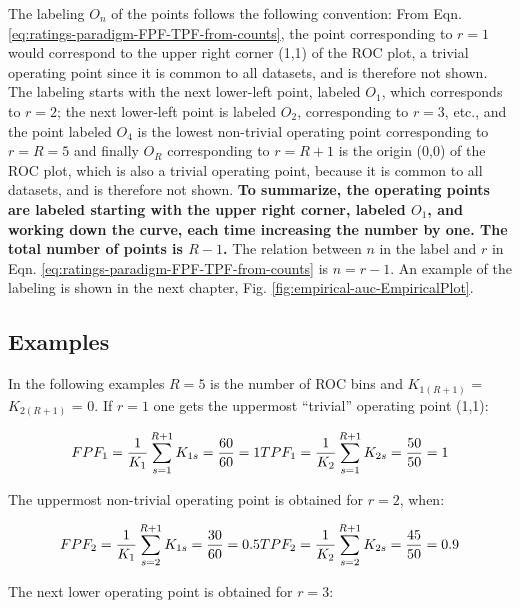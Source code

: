 \documentclass[
]{book}
\begin{document}
The labeling \(O_n\) of the points follows the following convention: From Eqn. \eqref{eq:ratings-paradigm-FPF-TPF-from-counts}, the point corresponding to \(r=1\) would correspond to the upper right corner (1,1) of the ROC plot, a trivial operating point since it is common to all datasets, and is therefore not shown. The labeling starts with the next lower-left point, labeled \(O_1\), which corresponds to \(r=2\); the next lower-left point is labeled \(O_2\), corresponding to \(r=3\), etc., and the point labeled \(O_4\) is the lowest non-trivial operating point corresponding to \(r=R=5\) and finally \(O_R\) corresponding to \(r=R+1\) is the origin (0,0) of the ROC plot, which is also a trivial operating point, because it is common to all datasets, and is therefore not shown. \textbf{To summarize, the operating points are labeled starting with the upper right corner, labeled \(O_1\), and working down the curve, each time increasing the number by one. The total number of points is \(R-1\).} The relation between \(n\) in the label and \(r\) in Eqn. \eqref{eq:ratings-paradigm-FPF-TPF-from-counts} is \(n=r-1\). An example of the labeling is shown in the next chapter, Fig. \ref{fig:empirical-auc-EmpiricalPlot}.

\hypertarget{ratings-task-examples}{%
\subsection{Examples}\label{ratings-task-examples}}

In the following examples \(R = 5\) is the number of ROC bins and \(K_{1(R+1)}\) = \(K_{2(R+1)}\) = 0. If \(r = 1\) one gets the uppermost ``trivial'' operating point (1,1):

\begin{equation*} 
FPF_1=\frac {1} {K_1} \sum_{s=1}^{R+1}K_{1s} = \frac{60}{60} = 1\\
TPF_1=\frac {1} {K_2} \sum_{s=1}^{R+1}K_{2s} = \frac{50}{50} = 1
\end{equation*}

The uppermost non-trivial operating point is obtained for \(r = 2\), when:

\begin{equation*} 
FPF_2=\frac {1} {K_1} \sum_{s=2}^{R+1}K_{1s} = \frac{30}{60} = 0.5\\
TPF_2=\frac {1} {K_2} \sum_{s=2}^{R+1}K_{2s} = \frac{45}{50} = 0.9
\end{equation*}

The next lower operating point is obtained for \(r = 3\):
\end{document}
